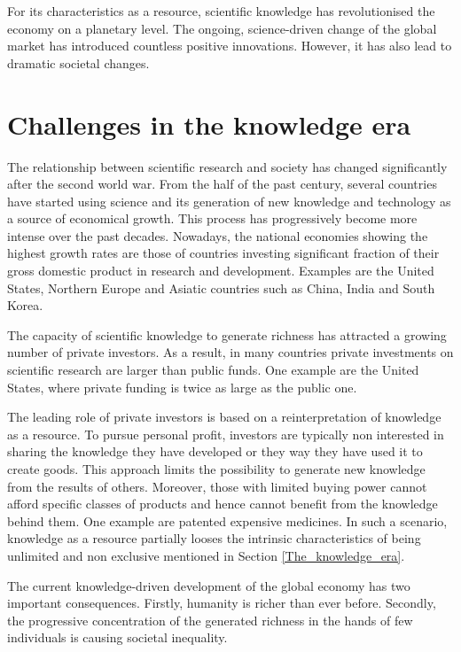 For its characteristics as a resource, scientific knowledge has revolutionised the economy on a planetary level. The ongoing, science-driven change of the global market has introduced countless positive innovations. However, it has also lead to dramatic societal changes.   

\section{Challenges in the knowledge era} \label{Challenges_in_the_knowledge_era}
The relationship between scientific research and society has changed significantly after the second world war. From the half of the past century, several countries have started using science and its generation of new knowledge and technology as a source of economical growth. This process has progressively become more intense over the past decades. Nowadays, the national economies showing the highest growth rates are those of countries investing significant fraction of their gross domestic product in research and development. Examples are the United States, Northern Europe and Asiatic countries such as China, India and South Korea.   

The capacity of scientific knowledge to generate richness has attracted a growing number of private investors. As a result, in many countries private investments on scientific research are larger than public funds. One example are the United States, where private funding is twice as large as the public one. 

The leading role of private investors is based on a reinterpretation of knowledge as a resource. To pursue personal profit, investors are typically non interested in sharing the knowledge they have developed or they way they have used it to create goods. This approach limits the possibility to generate new knowledge from the results of others. Moreover, those with limited buying power cannot afford specific classes of products and hence cannot benefit from the knowledge behind them. One example are patented expensive medicines. In such a scenario, knowledge as a resource partially looses the intrinsic characteristics of being unlimited and non exclusive mentioned in Section \ref{The_knowledge_era}. 

The current knowledge-driven development of the global economy has two important consequences. Firstly, humanity is richer than ever before. Secondly, the progressive concentration of the generated richness in the hands of few individuals is causing societal inequality. 

